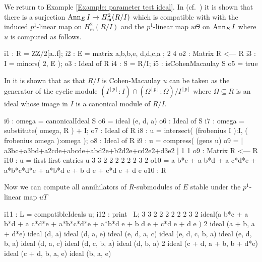 \documentclass{amsart}
\begin{document}
\begin{example}

We return to Example \ref{Example: parameter test ideal}.
In (cf.~\cite[\S 9]{KatzmanParameterTestIdealOfCMRings}) it is shown that
there is a surjection $\operatorname{{Ann}}_E I \rightarrow H^2_{\mathfrak{m}} (R/I)$
which is compatible with with the induced $p^1$-linear map on $H^2_{\mathfrak{m}} (R/I)$
and the $p^1$-linear map $u \Theta$ on $\operatorname{{Ann}}_E I$ where $u$ is computed as follows.

\medskip
{\small
\begin{MyVerbatim}
i1 : R = ZZ/2[a..f];
i2 : E = matrix { {a,b,b,e}, {d,d,c,a} };
             2       4
o2 : Matrix R  <--- R
i3 : I = minors( 2, E );
o3 : Ideal of R
i4 : S = R/I;
i5 : isCohenMacaulay S
o5 = true
\end{MyVerbatim}
}\medskip

In \cite{KatzmanParameterTestIdealOfCMRings} it is shown that as that $R/I$ is Cohen-Macaulay $u$
can be taken as the generator of the cyclic module $(I^{[p]}:I) \cap (\Omega^{[p]}:\Omega)/I^{[p]}$
where $\Omega \subseteq R$ is an ideal whose image in $I$ is a canonical module of $R/I$.


\medskip
{\small
\begin{MyVerbatim}
i6 : omega = canonicalIdeal S
o6 = ideal (e, d, a)
o6 : Ideal of S
i7 : omega = substitute( omega, R ) + I;
o7 : Ideal of R
i8 : u = intersect( (frobenius I ):I, ( frobenius omega ):omega );
o8 : Ideal of R
i9 : u = compress( (gens u) %
o9 = | a3bc+a3bd+a2cde+abcde+abd2e+b2d2e+cd2e2+d3e2 |
             1       1
o9 : Matrix R  <--- R
i10 : u = first first entries u
       3       3       2                         2     2 2       2 2    3 2
o10 = a b*c + a b*d + a c*d*e + a*b*c*d*e + a*b*d e + b d e + c*d e  + d e
o10 : R
\end{MyVerbatim}
}
\medskip

Now we can compute all annihilators of $R$-submodules of $E$ stable under the $p^1$-linear map $uT$

\medskip
{\small
\begin{MyVerbatim}
i11 : L = compatibleIdeals u;
i12 : print \ L;
       3       3       2                         2     2 2       2 2    3 2
ideal(a b*c + a b*d + a c*d*e + a*b*c*d*e + a*b*d e + b d e + c*d e  + d e )
               2
ideal (a + b, a  + d*e)
ideal (d, a)
ideal (d, a, e)
ideal (e, d, a, c)
ideal (e, d, c, b, a)
ideal (e, d, b, a)
ideal (d, a, c)
ideal (d, c, b, a)
ideal (d, b, a)
                      2
ideal (c + d, a + b, b  + d*e)
ideal (c + d, b, a, e)
ideal (b, a, e)
\end{MyVerbatim}
}
\medskip


\end{example}
\end{document}
